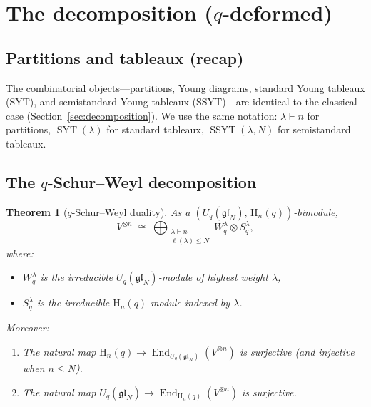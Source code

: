 \documentclass[12pt,a4paper]{article}
\newtheorem{theorem}{Theorem}[section]
\theoremstyle{definition}
\theoremstyle{remark}
\newcommand{\gl}{\mathfrak{gl}}
\newcommand{\End}{\operatorname{End}}
\newcommand{\SYT}{\operatorname{SYT}}
\newcommand{\SSYT}{\operatorname{SSYT}}
\begin{document}
\section{The decomposition ($q$-deformed)}
\label{sec:q-decomposition}

\subsection{Partitions and tableaux (recap)}

The combinatorial objects---partitions, Young diagrams, standard Young
tableaux (SYT), and semistandard Young tableaux (SSYT)---are identical
to the classical case (Section~\ref{sec:decomposition}). We use the
same notation: $\lambda \vdash n$ for partitions, $\SYT(\lambda)$ for
standard tableaux, $\SSYT(\lambda, N)$ for semistandard tableaux.

\subsection{The $q$-Schur--Weyl decomposition}

\begin{theorem}[$q$-Schur--Weyl duality]\label{thm:q-SW}
As a $(U_q(\gl_N),\, \mathrm{H}_n(q))$-bimodule,
\begin{equation}\label{eq:q-SW}
  V^{\otimes n}
  \;\cong\;
  \bigoplus_{\substack{\lambda \vdash n \\ \ell(\lambda) \leqslant N}}
  W_q^\lambda \otimes S_q^\lambda,
\end{equation}
where:
\begin{itemize}
\item $W_q^\lambda$ is the irreducible $U_q(\gl_N)$-module of highest
  weight $\lambda$,
\item $S_q^\lambda$ is the irreducible $\mathrm{H}_n(q)$-module indexed
  by $\lambda$.
\end{itemize}
Moreover:
\begin{enumerate}[label=(\alph*)]
\item The natural map
  $\mathrm{H}_n(q) \to \End_{U_q(\gl_N)}(V^{\otimes n})$ is surjective
  (and injective when $n \leqslant N$).
\item The natural map
  $U_q(\gl_N) \to \End_{\mathrm{H}_n(q)}(V^{\otimes n})$ is surjective.
\end{enumerate}
\end{theorem}
\end{document}
